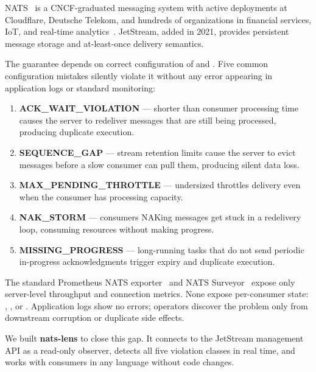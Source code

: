 \documentclass[sigconf,nonacm]{acmart}
\begin{document}
NATS~\cite{nats-docs} is a CNCF-graduated messaging system with active
deployments at Cloudflare, Deutsche Telekom, and hundreds of organizations in
financial services, IoT, and real-time analytics~\cite{nats-server}.
JetStream, added in 2021, provides persistent message storage and at-least-once
delivery semantics.

The guarantee depends on correct configuration of  and
. Five common configuration mistakes silently violate
it without any error appearing in application logs or standard monitoring:

\begin{enumerate}
\item \textbf{ACK\_\allowbreak WAIT\_\allowbreak VIOLATION} ---  shorter than consumer
  processing time causes the server to redeliver messages that are still being
  processed, producing duplicate execution.
\item \textbf{SEQUENCE\_GAP} --- stream retention limits cause the server to evict
  messages before a slow consumer can pull them, producing silent data loss.
\item \textbf{MAX\_\allowbreak PENDING\_\allowbreak THROTTLE} --- undersized 
  throttles delivery even when the consumer has processing capacity.
\item \textbf{NAK\_STORM} --- consumers NAKing messages get stuck in a redelivery
  loop, consuming resources without making progress.
\item \textbf{MISSING\_PROGRESS} --- long-running tasks that do not send periodic
  in-progress acknowledgments trigger  expiry and duplicate
  execution.
\end{enumerate}

The standard Prometheus NATS exporter~\cite{prometheus-nats} and NATS
Surveyor~\cite{surveyor} expose only server-level throughput and connection
metrics. None expose per-consumer state: ,
, or . Application
logs show no errors; operators discover the problem only from downstream
corruption or duplicate side effects.

We built \textbf{nats-lens} to close this gap. It connects to the JetStream
management API as a read-only observer, detects all five violation classes in
real time, and works with consumers in any language without code changes.
\end{document}
